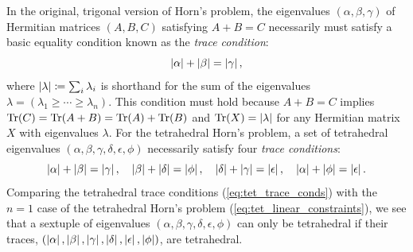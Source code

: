 \documentclass[notitlepage, 10pt]{article}
\begin{document}
\begin{rem}
    In the original, trigonal version of Horn's problem, the eigenvalues $(\alpha, \beta, \gamma)$ of Hermitian matrices $(A,B,C)$ satisfying $A+B=C$ necessarily must satisfy a basic equality condition known as the \textit{trace condition}:
    \begin{equation}
        \label{eq:tri_trace_cond}
        \left|\alpha\right|+\left|\beta\right|=\left|\gamma\right|,
    \end{equation}
    where $\left|\lambda\right| \coloneqq \sum_{i} \lambda_i$ is shorthand for the sum of the eigenvalues $\lambda = (\lambda_1 \geq \cdots \geq \lambda_n)$.
    This condition must hold because $A+B=C$ implies $\operatorname{Tr}(C) = \operatorname{Tr}(A+B) = \operatorname{Tr}(A)+\operatorname{Tr}(B)$ and $\operatorname{Tr}(X) = \left|\lambda\right|$ for any Hermitian matrix $X$ with eigenvalues $\lambda$.
    For the tetrahedral Horn's problem, a set of tetrahedral eigenvalues $(\alpha,\beta,\gamma,\delta,\epsilon,\phi)$ necessarily satisfy four \textit{trace conditions}:
    \begin{equation}
        \label{eq:tet_trace_conds}
        \left|\alpha\right| + \left|\beta\right| = \left|\gamma\right|, \quad
        \left|\beta\right| + \left|\delta\right| = \left|\phi\right|, \quad
        \left|\delta\right| + \left|\gamma\right| = \left|\epsilon\right|, \quad
        \left|\alpha\right| + \left|\phi\right| = \left|\epsilon\right|.
    \end{equation}
    Comparing the tetrahedral trace conditions (\cref{eq:tet_trace_conds}) with the $n=1$ case of the tetrahedral Horn's problem (\cref{eq:tet_linear_constraints}), we see that a sextuple of eigenvalues $(\alpha,\beta,\gamma,\delta,\epsilon,\phi)$ can only be tetrahedral if their traces, $(\left|\alpha\right|, \left|\beta\right|, \left|\gamma\right|, \left|\delta\right|, \left|\epsilon\right|, \left|\phi\right|)$, are tetrahedral.
\end{rem}
\end{document}
